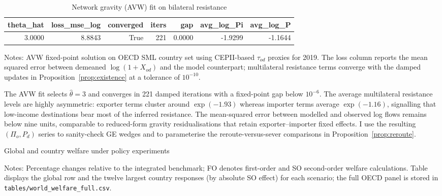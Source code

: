 \documentclass[12pt]{article}
\begin{document}
\begin{table}[t]
    \centering
    \caption{Network gravity (AVW) fit on bilateral resistance}
    \label{tab:network_gravity}
    {\begingroup
    \setlength{\tabcolsep}{6pt}
    \renewcommand{\arraystretch}{0.95}
    \small
    \begin{tabular}{rrrrrrr}
        \toprule
        theta\_hat & loss\_mse\_log & converged & iters & gap & avg\_log\_Pi & avg\_log\_P \\
        \midrule
        3.0000 & 8.8843 & True & 221 & 0.0000 & -1.9299 & -1.1644 \\
        \bottomrule
    \end{tabular}
    \endgroup}
    \vspace{0.5ex}
    \begin{minipage}{0.92\linewidth}
        \footnotesize
        Notes: AVW fixed-point solution on OECD SML country set using CEPII-based $\tau_{od}$ proxies for 2019. The loss column reports the mean squared error between demeaned $\log(1+X_{od})$ and the model counterpart; multilateral resistance terms converge with the damped updates in Proposition~\ref{prop:existence} at a tolerance of $10^{-10}$.
    \end{minipage}
\end{table}

The AVW fit selects $\hat{\theta}=3$ and converges in 221 damped iterations with a fixed-point gap below $10^{-6}$. The average multilateral resistance levels are highly asymmetric: exporter terms cluster around $\exp(-1.93)$ whereas importer terms average $\exp(-1.16)$, signalling that low-income destinations bear most of the inferred resistance. The mean-squared error between modelled and observed log flows remains below nine units, comparable to reduced-form gravity residualisations that retain exporter--importer fixed effects. I use the resulting $(\Pi_o, P_d)$ series to sanity-check GE wedges and to parameterise the reroute-versus-sever comparisons in Proposition~\ref{prop:reroute}.

\begin{table}[t]
    \centering
    \caption{Global and country welfare under policy experiments}
    \label{tab:world_welfare}
    {\begingroup
    \setlength{\tabcolsep}{4.5pt}
    \renewcommand{\arraystretch}{0.82}
    \scriptsize
    
    \endgroup}
    \vspace{0.5ex}
    \begin{minipage}{0.92\linewidth}
        \footnotesize
        Notes: Percentage changes relative to the integrated benchmark; FO denotes first-order and SO second-order welfare calculations. Table displays the global row and the twelve largest country responses (by absolute SO effect) for each scenario; the full OECD panel is stored in \texttt{tables/world\_welfare\_full.csv}.
    \end{minipage}
\end{table}
\end{document}
